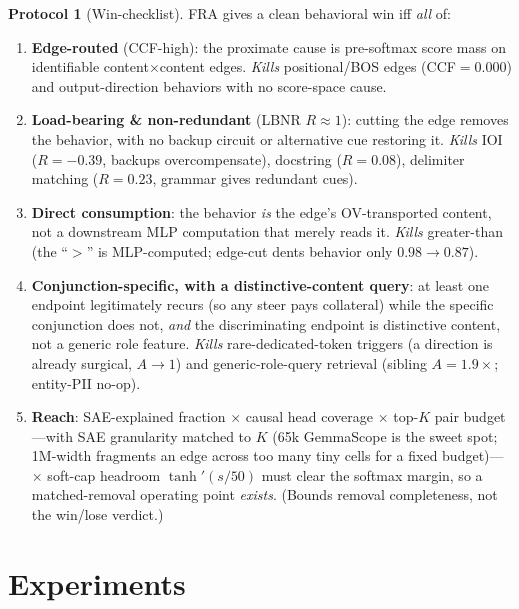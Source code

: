 \documentclass[11pt]{article}
\theoremstyle{definition}
\newtheorem{protocol}{Protocol}
\theoremstyle{plain}
\theoremstyle{remark}
\begin{document}
\begin{protocol}[Win-checklist]\label{prot:checklist}
FRA gives a clean behavioral win iff \emph{all} of:
\begin{enumerate}[leftmargin=2em,itemsep=2pt]
  \item \textbf{Edge-routed} (CCF-high): the proximate cause is pre-softmax score mass on identifiable content$\times$content edges. \emph{Kills} positional/BOS edges (CCF$=0.000$) and output-direction behaviors with no score-space cause.
  \item \textbf{Load-bearing \& non-redundant} (LBNR $R\approx 1$): cutting the edge removes the behavior, with no backup circuit or alternative cue restoring it. \emph{Kills} IOI ($R{=}{-}0.39$, backups overcompensate), docstring ($R{=}0.08$), delimiter matching ($R{=}0.23$, grammar gives redundant cues).
  \item \textbf{Direct consumption}: the behavior \emph{is} the edge's OV-transported content, not a downstream MLP computation that merely reads it. \emph{Kills} greater-than (the ``$>$'' is MLP-computed; edge-cut dents behavior only $0.98{\to}0.87$).
  \item \textbf{Conjunction-specific, with a distinctive-content query}: at least one endpoint legitimately recurs (so any steer pays collateral) while the specific conjunction does not, \emph{and} the discriminating endpoint is distinctive content, not a generic role feature. \emph{Kills} rare-dedicated-token triggers (a direction is already surgical, $A\to 1$) and generic-role-query retrieval (sibling $A{=}1.9\times$; entity-PII no-op).
  \item \textbf{Reach}: SAE-explained fraction $\times$ causal head coverage $\times$ top-$K$ pair budget---with SAE granularity matched to $K$ (65k GemmaScope is the sweet spot; 1M-width fragments an edge across too many tiny cells for a fixed budget)---$\times$ soft-cap headroom $\tanh'(s/50)$ must clear the softmax margin, so a matched-removal operating point \emph{exists}. (Bounds removal completeness, not the win/lose verdict.)
\end{enumerate}
\end{protocol}

\section{Experiments}\label{sec:experiments}
\end{document}
